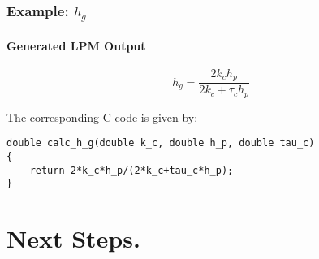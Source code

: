 \documentclass{beamer}
\begin{document}



\begin{frame}[fragile]

\frametitle{Example: $h_g$}

\framesubtitle{Generated LPM Output}


\begin{equation}
h_{g} =\frac{2k_{c}h_{p}}{2k_{c}+\tau_{c}h_{p}}\label{eq:hg}
\end{equation}

The corresponding C code is given by:

\begin{lstlisting}[basicstyle=\tiny]
double calc_h_g(double k_c, double h_p, double tau_c)
{
	return 2*k_c*h_p/(2*k_c+tau_c*h_p);
}
\end{lstlisting}
\end{frame}




\section[Next Steps]{Next Steps.}
\end{document}
